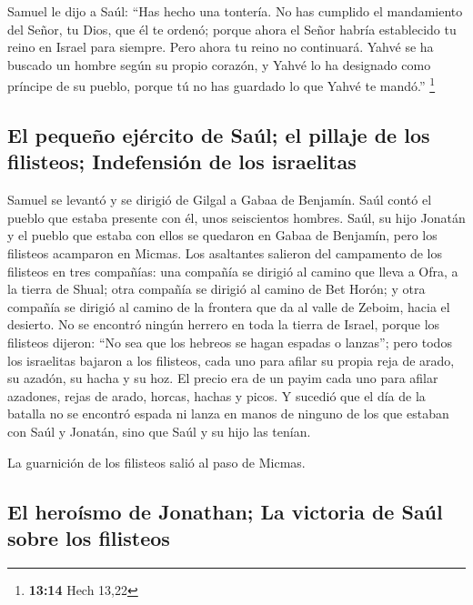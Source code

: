  Samuel le dijo a Saúl: ``Has hecho una tontería. No has
cumplido el mandamiento del Señor, tu Dios, que él te ordenó; porque
ahora el Señor habría establecido tu reino en Israel para siempre.
 Pero ahora tu reino no continuará. Yahvé se ha buscado
un hombre según su propio corazón, y Yahvé lo ha designado como príncipe
de su pueblo, porque tú no has guardado lo que Yahvé te mandó.''
\footnote{\textbf{13:14} Hech 13,22}

\hypertarget{el-pequeuxf1o-ejuxe9rcito-de-sauxfal-el-pillaje-de-los-filisteos-indefensiuxf3n-de-los-israelitas}{%
\subsection{El pequeño ejército de Saúl; el pillaje de los filisteos;
Indefensión de los
israelitas}\label{el-pequeuxf1o-ejuxe9rcito-de-sauxfal-el-pillaje-de-los-filisteos-indefensiuxf3n-de-los-israelitas}}

 Samuel se levantó y se dirigió de Gilgal a Gabaa de
Benjamín. Saúl contó el pueblo que estaba presente con él, unos
seiscientos hombres.  Saúl, su hijo Jonatán y el pueblo
que estaba con ellos se quedaron en Gabaa de Benjamín, pero los
filisteos acamparon en Micmas.  Los asaltantes salieron
del campamento de los filisteos en tres compañías: una compañía se
dirigió al camino que lleva a Ofra, a la tierra de Shual;
 otra compañía se dirigió al camino de Bet Horón; y otra
compañía se dirigió al camino de la frontera que da al valle de Zeboim,
hacia el desierto.  No se encontró ningún herrero en toda
la tierra de Israel, porque los filisteos dijeron: ``No sea que los
hebreos se hagan espadas o lanzas'';  pero todos los
israelitas bajaron a los filisteos, cada uno para afilar su propia reja
de arado, su azadón, su hacha y su hoz.  El precio era de
un payim cada uno para afilar azadones, rejas de arado, horcas, hachas y
picos.  Y sucedió que el día de la batalla no se encontró
espada ni lanza en manos de ninguno de los que estaban con Saúl y
Jonatán, sino que Saúl y su hijo las tenían.

 La guarnición de los filisteos salió al paso de Micmas.

\hypertarget{el-herouxedsmo-de-jonathan-la-victoria-de-sauxfal-sobre-los-filisteos}{%
\subsection{El heroísmo de Jonathan; La victoria de Saúl sobre los
filisteos}\label{el-herouxedsmo-de-jonathan-la-victoria-de-sauxfal-sobre-los-filisteos}}

